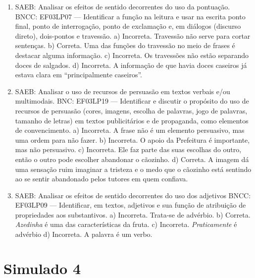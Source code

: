 \begin{enumerate}
\item
SAEB: Analisar os efeitos de sentido decorrentes do uso da pontuação. BNCC: EF03LP07 --- Identificar a função na leitura e usar na escrita ponto final, ponto de interrogação, ponto de exclamação e, em diálogos (discurso direto), dois-pontos e travessão. a) Incorreta. Travessão não serve para cortar sentenças. b) Correta. Uma das funções do travessão no meio de frases é destacar alguma informação. c) Incorreta. Os travessões não estão separando doces de salgados. d) Incorreta. A informação de que havia doces caseiros já estava clara em ``principalmente caseiros''.

\item
SAEB: Analisar o uso de recursos de persuasão em textos verbais e/ou multimodais. BNC: EF03LP19 --- Identificar e discutir o propósito do uso de recursos de persuasão (cores, imagens, escolha de palavras, jogo de palavras, tamanho de letras) em textos publicitários e de propaganda, como elementos de convencimento. a) Incorreta. A frase não é um elemento persuasivo, mas uma ordem para não fazer. b) Incorreta. O apoio da Prefeitura é importante, mas não persuasivo. c) Incorreta. Ele faz parte das suas escolhas do outro, então o outro pode escolher abandonar o cãozinho. d) Correta. A imagem dá uma sensação ruim imaginar a tristeza e o medo que o cãozinho está sentindo ao se sentir abandonado pelos tutores em quem confiava.

\item
SAEB: Analisar os efeitos de sentido decorrentes do uso dos adjetivos BNCC: EF03LP09 --- Identificar, em textos, adjetivos e sua função de atribuição de propriedades aos substantivos. a) Incorreta. Trata-se de advérbio. b) Correta. \emph{Azedinha} é uma das características da fruta. c) Incorreta. \emph{Praticamente} é advérbio d) Incorreta. A palavra é um verbo.
\end{enumerate}

\section*{Simulado 4}

